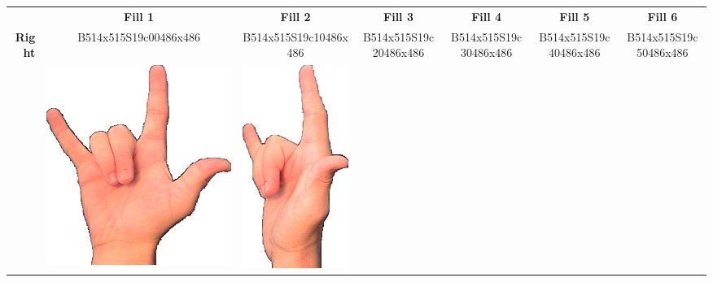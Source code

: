 \documentclass{article}
\begin{document}
\begin{center}
\begin{tabular}{r*{6}{c}}
&\textbf{Fill 1}&\textbf{Fill 2}&\textbf{Fill 3}&\textbf{Fill 4}&\textbf{Fill 5}&\textbf{Fill 6}\\
\multirow{2}{*}{\textbf{Right}}&
B514x515S19c00486x486&
B514x515S19c10486x486&
B514x515S19c20486x486&
B514x515S19c30486x486&
B514x515S19c40486x486&
B514x515S19c50486x486\\
&
\includegraphics[scale=0.1]{images/06-09-1.jpg}&
\includegraphics[scale=0.1]{images/06-09-2.jpg}&

\end{tabular}
\end{center}
\end{document}
